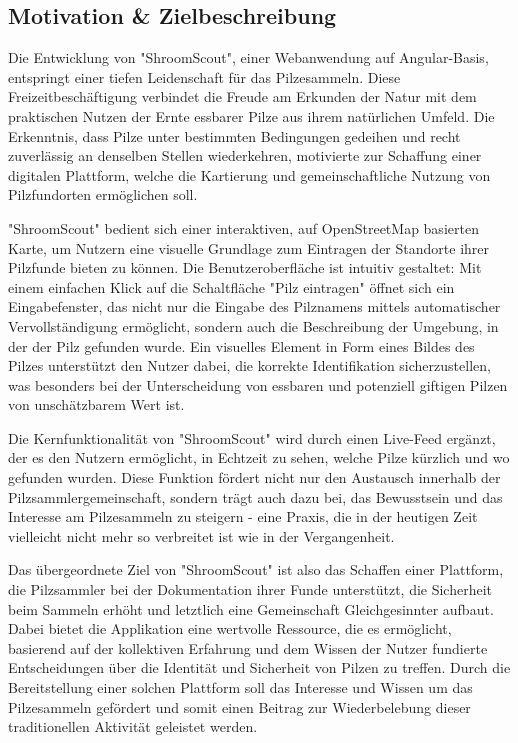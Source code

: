 \documentclass[../main.tex]{subfiles}
\begin{document}
\subsection{Motivation \& Zielbeschreibung}
Die Entwicklung von "ShroomScout", einer Webanwendung auf Angular-Basis, entspringt einer tiefen Leidenschaft 
für das Pilzesammeln. Diese Freizeitbeschäftigung verbindet die Freude am Erkunden der Natur mit dem praktischen 
Nutzen der Ernte essbarer Pilze aus ihrem natürlichen Umfeld. Die Erkenntnis, dass Pilze unter bestimmten Bedingungen 
gedeihen und recht zuverlässig an denselben Stellen wiederkehren, motivierte zur Schaffung einer digitalen Plattform, 
welche die Kartierung und gemeinschaftliche Nutzung von Pilzfundorten ermöglichen soll.

"ShroomScout" bedient sich einer interaktiven, auf OpenStreetMap basierten Karte, um Nutzern eine visuelle 
Grundlage zum Eintragen der Standorte ihrer Pilzfunde bieten zu können. Die Benutzeroberfläche ist intuitiv gestaltet: 
Mit einem einfachen Klick auf die Schaltfläche "Pilz eintragen" öffnet sich ein Eingabefenster, das nicht nur die 
Eingabe des Pilznamens mittels automatischer Vervollständigung ermöglicht, sondern auch die Beschreibung der Umgebung, 
in der der Pilz gefunden wurde. Ein visuelles Element in Form eines Bildes des Pilzes unterstützt den Nutzer dabei, 
die korrekte Identifikation sicherzustellen, was besonders bei der Unterscheidung von essbaren und potenziell giftigen 
Pilzen von unschätzbarem Wert ist.

Die Kernfunktionalität von "ShroomScout" wird durch einen Live-Feed ergänzt, der es den Nutzern ermöglicht, 
in Echtzeit zu sehen, welche Pilze kürzlich und wo gefunden wurden. Diese Funktion fördert nicht nur den 
Austausch innerhalb der Pilzsammlergemeinschaft, sondern trägt auch dazu bei, das Bewusstsein und das 
Interesse am Pilzesammeln zu steigern - eine Praxis, die in der heutigen Zeit vielleicht nicht mehr so 
verbreitet ist wie in der Vergangenheit.

Das übergeordnete Ziel von "ShroomScout" ist also das Schaffen einer Plattform, die Pilzsammler bei der Dokumentation 
ihrer Funde unterstützt, die Sicherheit beim Sammeln erhöht und letztlich eine Gemeinschaft Gleichgesinnter 
aufbaut. Dabei bietet die Applikation eine wertvolle Ressource, die es ermöglicht, basierend auf der kollektiven Erfahrung 
und dem Wissen der Nutzer fundierte Entscheidungen über die Identität und Sicherheit von Pilzen zu treffen. Durch die 
Bereitstellung einer solchen Plattform soll das Interesse und Wissen um das Pilzesammeln gefördert und somit einen Beitrag 
zur Wiederbelebung dieser traditionellen Aktivität geleistet werden.
\end{document}
